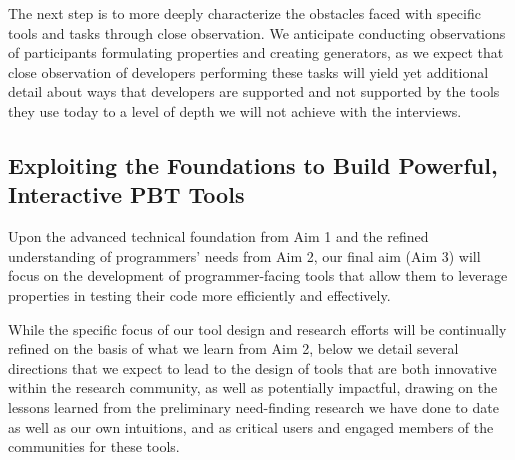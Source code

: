 
The next step is to more deeply characterize the obstacles faced with specific
tools and tasks through close observation. We anticipate conducting observations
of participants formulating properties and creating generators, as we expect
that close observation of developers performing these tasks will yield yet
additional detail about ways that developers are supported and not supported by
the tools they use today to a level of depth we will not achieve with the
interviews.

\subsection{Exploiting the Foundations to Build Powerful, Interactive PBT Tools }
\label{sec:tools}

Upon the advanced technical foundation from Aim 1 and the refined understanding
of programmers' needs from Aim 2, our final aim (Aim 3) will focus on the
development of programmer-facing tools that allow them to leverage properties in
testing their code more efficiently and effectively.

While the specific focus of our tool design and research efforts will be
continually refined on the basis of what we learn from Aim 2, below we detail
several directions that we expect to lead to the design of tools that are both
innovative within the research community, as well as potentially impactful,
drawing on the lessons learned from the preliminary need-finding research we
have done to date as well as our own intuitions, and as critical users and
engaged members of the communities for these tools.


